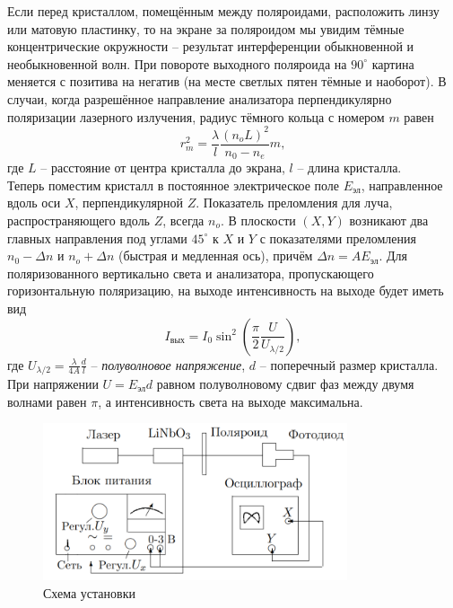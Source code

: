 \documentclass[a4paper,12pt]{report}
\begin{document}
Если перед кристаллом, помещённым между поляроидами, расположить линзу или матовую пластинку, то на экране за поляроидом мы увидим тёмные концентрические окружности -- результат интерференции обыкновенной и необыкновенной волн. При повороте выходного поляроида на $90^\circ$ картина меняется с позитива на негатив (на месте светлых пятен тёмные и наоборот). В случаи, когда разрешённое направление анализатора перпендикулярно поляризации лазерного излучения, радиус тёмного кольца с номером $m$ равен
\begin{equation}
r_m^2 = \dfrac{\lambda}{l} \dfrac{(n_oL)^2}{n_0 - n_e}m,
\end{equation}
где $L$ -- расстояние от центра кристалла до экрана, $l$ -- длина кристалла.\\
Теперь поместим кристалл в постоянное электрическое поле $E_{\text{эл}}$, направленное вдоль оси $X$, перпендикулярной $Z$. Показатель преломления для луча, распространяющего вдоль $Z$, всегда $n_o$. В плоскости $(X,Y)$ возникают два главных направления под углами $45^\circ$ к $X$ и $Y$ с показателями преломления $n_0 - \Delta n$ и $n_o + \Delta n$ (быстрая и медленная ось), причём $\Delta n = A E_{\text{эл}}$. Для поляризованного вертикально света и анализатора, пропускающего горизонтальную поляризацию, на выходе интенсивность на выходе будет иметь вид
\begin{equation}
I_{\text{вых}} = I_0 \sin^2 \left(\dfrac{\pi}{2} \dfrac{U}{U_{\lambda/2}} \right),
\end{equation}
где $U_{\lambda/2} = \frac{\lambda}{4A}\frac{d}{l}$ -- \textit{полуволновое напряжение}, $d$ -- поперечный размер кристалла.  При напряжении $U = E_{\text{эл}}d$ равном полуволновому сдвиг фаз между двумя волнами равен $\pi$, а интенсивность света на выходе максимальна. 

\begin{figure}[H]
\includegraphics[width = 0.8\textwidth]{2.png}
\centering
\caption{Схема установки}
\end{figure}
\end{document}
